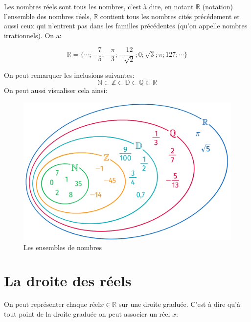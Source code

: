 \documentclass[10pt,a4paper,oneside]{book}
\newcommand{\N}{\mathbb{N}}
\newcommand{\Z}{\mathbb{Z}}
\newcommand{\D}{\mathbb{D}}
\newcommand{\Q}{\mathbb{Q}}
\newcommand{\R}{\mathbb{R}}
\begin{document}
Les nombres réels sont tous les nombres, c'est à dire, en notant $\R$ 
(notation) l'ensemble des nombres réels, $\R$ contient tous les nombres cités précédement et aussi ceux 
qui n'entrent pas dans les familles précédentes (qu'on appelle nombres irrationnels). On a:

$$\R=\{\cdots;-\frac{7}{5};-\frac{\pi}{3};-\frac{12}{\sqrt{2}};0;\sqrt{3};\pi;127;\cdots\}$$

On peut remarquer les inclusions suivantes:
$$\N\subset\Z\subset\D\subset\Q\subset\R$$
On peut aussi visualiser cela ainsi:



\begin{figure}[htbp]
\centering
\includegraphics[width=1.0\textwidth]{Ensemble.png}
\caption{Les ensembles de nombres}
\label{fig:Ensembles}
\end{figure}



\section{La droite des réels}

On peut représenter chaque réel$x\in\R$ sur une droite graduée. C'est à dire 
qu'à tout point de la droite graduée on peut associer un réel $x$:
\end{document}
